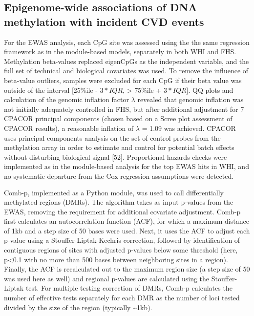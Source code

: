 \documentclass[]{article}
\theoremstyle{definition}
\theoremstyle{definition}
\theoremstyle{definition}
\theoremstyle{remark}
\begin{document}
\subsection{Epigenome-wide associations of DNA methylation with incident
CVD
events}\label{epigenome-wide-associations-of-dna-methylation-with-incident-cvd-events}

For the EWAS analysis, each CpG site was assessed using the the same
regression framework as in the module-based models, separately in both
WHI and FHS. Methylation beta-values replaced eigenCpGs as the
independent variable, and the full set of technical and biological
covariates was used. To remove the influence of beta-value outliers,
samples were excluded for each CpG if their beta value was outside of
the interval {[}25\%ile - \(3*IQR\), \textgreater{} 75\%ile +
\(3*IQR\){]}. QQ plots and calculation of the genomic inflation factor
\(\lambda\) revealed that genomic inflation was not initially adequately
controlled in FHS, but after additional adjustment for 7 CPACOR
principal components (chosen based on a Scree plot assessment of CPACOR
results), a reasonable inflation of \(\lambda\) = 1.09 was achieved.
CPACOR uses principal components analysis on the set of control probes
from the methylation array in order to estimate and control for
potential batch effects without disturbing biological signal {[}52{]}.
Proportional hazards checks were implemented as in the module-based
analysis for the top EWAS hits in WHI, and no systematic departure from
the Cox regression assumptions were detected.

Comb-p, implemented as a Python module, was used to call differentially
methylated regions (DMRs). The algorithm takes as input p-values from
the EWAS, removing the requirement for additional covariate adjustment.
Comb-p first calculates an autocorrelation function (ACF), for which a
maximum distance of 1kb and a step size of 50 bases were used. Next, it
uses the ACF to adjust each p-value using a Stouffer-Liptak-Kechris
correction, followed by identification of contiguous regions of sites
with adjusted p-values below some threshold (here, p\textless{}0.1 with
no more than 500 bases between neighboring sites in a region). Finally,
the ACF is recalculated out to the maximum region size (a step size of
50 was used here as well) and regional p-values are calculated using the
Stouffer-Liptak test. For multiple testing correction of DMRs, Comb-p
calculates the number of effective tests separately for each DMR as the
number of loci tested divided by the size of the region (typically
\textasciitilde{}1kb).
\end{document}

